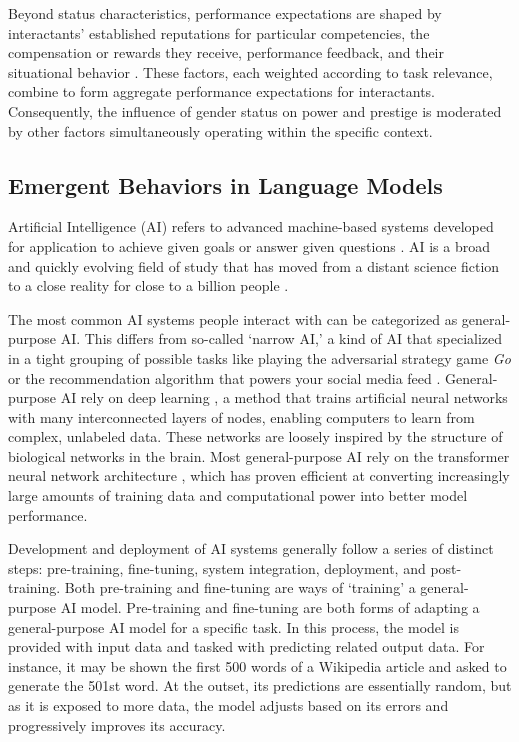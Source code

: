 Beyond status characteristics, performance expectations are shaped by interactants' established reputations for particular competencies, the compensation or rewards they receive, performance feedback, and their situational behavior \citep{Berger-1974-ExpectationStatesTheory, Berger-1985-StatusRewards}. These factors, each weighted according to task relevance, combine to form aggregate performance expectations for interactants. Consequently, the influence of gender status on power and prestige is moderated by other factors simultaneously operating within the specific context.

\subsection{Emergent Behaviors in Language Models}

Artificial Intelligence (AI) refers to advanced machine-based systems developed for application to achieve given goals or answer given questions \citep{Bengio-2024-International, Bostrom-2014-Superintelligence}. AI is a broad and quickly evolving field of study that has moved from a distant science fiction to a close reality for close to a billion people \citep{Handa-2025-WhichEconomic, Chatterji-2025-HowPeopleUse}.

The most common AI systems people interact with can be categorized as general-purpose AI. This differs from so-called `narrow AI,' a kind of AI that specialized in a tight grouping of possible tasks like playing the adversarial strategy game \textit{Go} or the recommendation algorithm that powers your social media feed \citep{Silver-2016-MasteringGo, Narayanan-2023-Understanding}. General-purpose AI rely on deep learning \citep{LeCun-2015-DeepLearning}, a method that trains artificial neural networks with many interconnected layers of nodes, enabling computers to learn from complex, unlabeled data. These networks are loosely inspired by the structure of biological networks in the brain. Most general-purpose AI rely on the transformer neural network architecture \citep{Vaswani-2017-Attention}, which has proven efficient at converting increasingly large amounts of training data and computational power into better model performance.

Development and deployment of AI systems generally follow a series of distinct steps: pre-training, fine-tuning, system integration, deployment, and post-training. Both pre-training and fine-tuning are ways of ‘training’ a general-purpose AI model. Pre-training and fine-tuning are both forms of adapting a general-purpose AI model for a specific task. In this process, the model is provided with input data and tasked with predicting related output data. For instance, it may be shown the first 500 words of a Wikipedia article and asked to generate the 501st word. At the outset, its predictions are essentially random, but as it is exposed to more data, the model adjusts based on its errors and progressively improves its accuracy.

